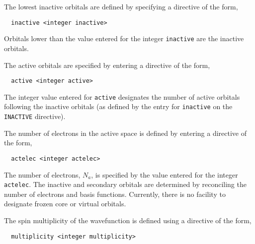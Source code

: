 The lowest inactive orbitals are defined by specifying a directive of
the form,

\begin{verbatim}
  inactive <integer inactive>
\end{verbatim}

Orbitals lower than the value entered for the integer \verb+inactive+
are the inactive orbitals.

The active orbitals are specified by entering a directive of the form,

\begin{verbatim}
  active <integer active>
\end{verbatim}

The integer value entered for \verb+active+ designates the number of active
orbitals following the inactive orbitals (as defined by the entry for
\verb+inactive+ on the \verb+INACTIVE+ directive). 


The number of electrons in the active space is defined by entering a
directive of the form,

\begin{verbatim}
  actelec <integer actelec>
\end{verbatim}

The number of electrons,  $N_{a}$, is specified by the value entered
for the integer \verb+actelec+. The inactive and secondary orbitals are
determined by reconciling the number of electrons and basis
functions. Currently, there is no facility to designate frozen core or
virtual orbitals. 





The spin multiplicity of the wavefunction is defined using a directive
of the form,

\begin{verbatim}
  multiplicity <integer multiplicity>
\end{verbatim}

